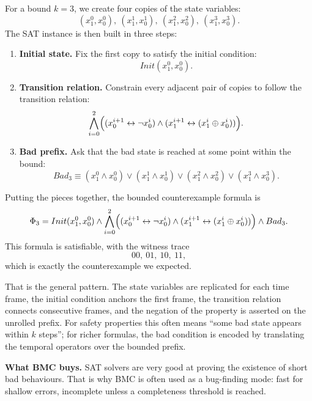 For a bound $k=3$, we create four copies of the state variables:
\[
  (x_1^0,x_0^0),\ (x_1^1,x_0^1),\ (x_1^2,x_0^2),\ (x_1^3,x_0^3).
\]
The SAT instance is then built in three steps:
\begin{enumerate}
  \item \textbf{Initial state.}  Fix the first copy to satisfy the initial
        condition:
        \[
          Init(x_1^0,x_0^0).
        \]
  \item \textbf{Transition relation.}  Constrain every adjacent pair of
        copies to follow the transition relation:
        \[
          \bigwedge_{i=0}^{2}
          \Bigl((x_0^{i+1} \leftrightarrow \neg x_0^i) \land
                (x_1^{i+1} \leftrightarrow (x_1^i \oplus x_0^i))\Bigr).
        \]
  \item \textbf{Bad prefix.}  Ask that the bad state is reached at some point
        within the bound:
        \[
          Bad_3 \equiv
          (x_1^0 \land x_0^0) \lor
          (x_1^1 \land x_0^1) \lor
          (x_1^2 \land x_0^2) \lor
          (x_1^3 \land x_0^3).
        \]
\end{enumerate}
Putting the pieces together, the bounded counterexample formula is
\[
  \Phi_3 =
  Init(x_1^0,x_0^0)
  \land \bigwedge_{i=0}^{2}
    \Bigl((x_0^{i+1} \leftrightarrow \neg x_0^i) \land
          (x_1^{i+1} \leftrightarrow (x_1^i \oplus x_0^i))\Bigr)
  \land Bad_3.
\]
This formula is satisfiable, with the witness trace
\[
  00,\ 01,\ 10,\ 11,
\]
which is exactly the counterexample we expected.

That is the general pattern.  The state variables are replicated for each time
frame, the initial condition anchors the first frame, the transition relation
connects consecutive frames, and the negation of the property is asserted on
the unrolled prefix.  For safety properties this often means ``some bad state
appears within $k$ steps''; for richer formulas, the bad condition is encoded
by translating the temporal operators over the bounded prefix.

\medskip\noindent
\textbf{What BMC buys.}  SAT solvers are very good at proving the existence of
short bad behaviours.  That is why BMC is often used as a bug-finding mode:
fast for shallow errors, incomplete unless a completeness threshold is
reached.

